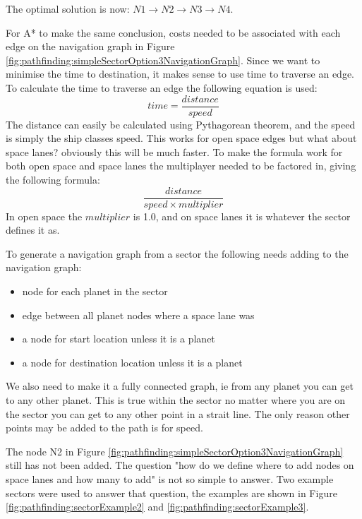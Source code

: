 The optimal solution is now: $N1 \to N2 \to N3 \to N4$.

For A* to make the same conclusion, costs needed to be associated with each edge on the navigation graph in Figure \ref{fig:pathfinding:simpleSectorOption3NavigationGraph}.
Since we want to minimise the time to destination, it makes sense to use time to traverse an edge.
To calculate the time to traverse an edge the following equation is used:
$$ time = \frac{distance}{speed} $$
The distance can easily be calculated using Pythagorean theorem, and the speed is simply the ship classes speed.
This works for open space edges but what about space lanes? obviously this will be much faster.
To make the formula work for both open space and space lanes the multiplayer needed to be factored in, giving the following formula:
$$ \frac{distance}{speed \times multiplier} $$
In open space the $multiplier$ is 1.0, and on space lanes it is whatever the sector defines it as.

To generate a navigation graph from a sector the following needs adding to the navigation graph:
\begin{itemize}
\item node for each planet in the sector
\item edge between all planet nodes where a space lane was
\item a node for start location unless it is a planet
\item a node for destination location unless it is a planet
\end{itemize}

We also need to make it a fully connected graph, ie from any planet you can get to any other planet.
This is true within the sector no matter where you are on the sector you can get to any other point in a strait line. 
The only reason other points may be added to the path is for speed.

The node N2 in Figure \ref{fig:pathfinding:simpleSectorOption3NavigationGraph} still has not been added.
The question "how do we define where to add nodes on space lanes and how many to add" is not so simple to answer.
Two example sectors were used to answer that question, the examples are shown in Figure \ref{fig:pathfinding:sectorExample2} and \ref{fig:pathfinding:sectorExample3}.

